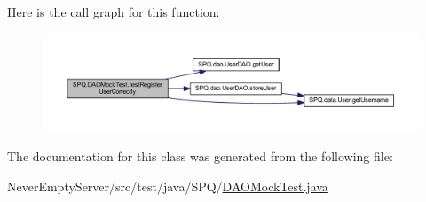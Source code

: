 Here is the call graph for this function\+:
\nopagebreak
\begin{figure}[H]
\begin{center}
\leavevmode
\includegraphics[width=350pt]{class_s_p_q_1_1_d_a_o_mock_test_a52505d1cfefe105f8098147df9d2fce0_cgraph}
\end{center}
\end{figure}


The documentation for this class was generated from the following file\+:\begin{DoxyCompactItemize}
\item 
Never\+Empty\+Server/src/test/java/\+S\+P\+Q/\mbox{\hyperlink{_d_a_o_mock_test_8java}{D\+A\+O\+Mock\+Test.\+java}}\end{DoxyCompactItemize}
